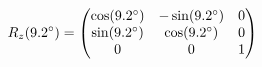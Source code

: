 \documentclass[preview]{standalone}
\begin{document}
\begin{align*}
\special{dvisvgm:raw <g id='unique000'>}R_z(9.2^\circ) = \begin{pmatrix} \cos(9.2^\circ) & -\sin(9.2^\circ) & 0 \\ \sin(9.2^\circ) & \cos(9.2^\circ) & 0 \\ 0 & 0 & 1 \end{pmatrix}\special{dvisvgm:raw </g>}
\end{align*}
\end{document}
